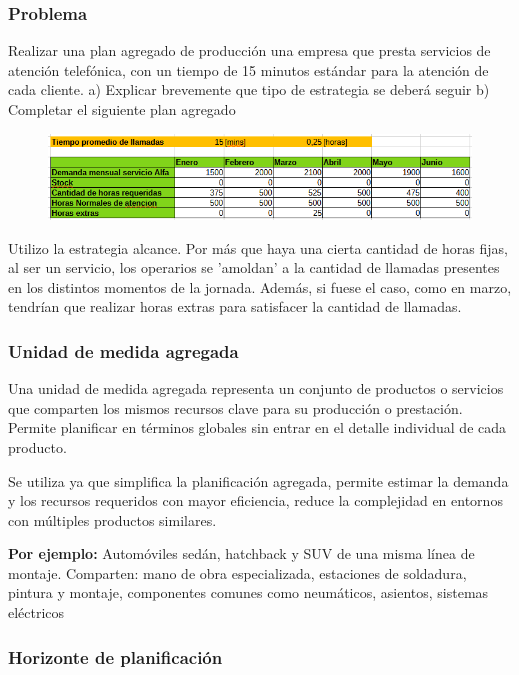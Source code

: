 \documentclass[a4paper,oneside,11pt]{article}
\begin{document}
\subsubsection{Problema}

Realizar una plan agregado de producción una empresa que presta servicios de atención
telefónica, con un tiempo de 15 minutos estándar para la atención de cada cliente.
 a) Explicar brevemente que tipo de estrategia se deberá seguir
 b) Completar el siguiente plan agregado

\begin{figure} [ht!]
    \centering
    \includegraphics[scale=.9]{tablita.png}
\end{figure}

Utilizo la estrategia alcance. Por más que haya una cierta cantidad de horas fijas, al ser un servicio, los operarios se 'amoldan' a la cantidad de llamadas presentes en los distintos momentos de la jornada. Además, si fuese el caso, como en marzo, tendrían que realizar horas extras para satisfacer la cantidad de llamadas.

\subsubsection{Unidad de medida agregada}

Una unidad de medida agregada representa un conjunto de productos o servicios que comparten los mismos recursos clave para su producción o prestación. Permite planificar en términos globales sin entrar en el detalle individual de cada producto.

Se utiliza ya que simplifica la planificación agregada, permite estimar la demanda y los recursos requeridos con mayor eficiencia, reduce la complejidad en entornos con múltiples productos similares.

\textbf{Por ejemplo:} Automóviles sedán, hatchback y SUV de una misma línea de montaje. Comparten: mano de obra especializada, estaciones de soldadura, pintura y montaje, componentes comunes como neumáticos, asientos, sistemas eléctricos

\subsubsection{Horizonte de planificación}
\end{document}
